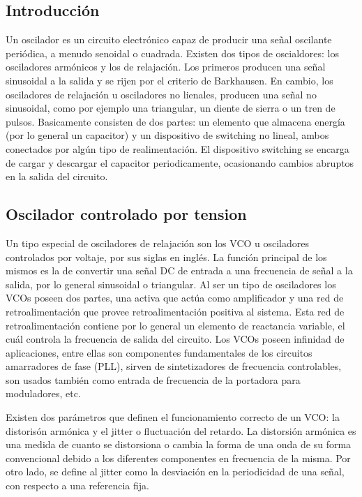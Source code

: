 \subsection{Introducción}

Un oscilador es un circuito electrónico capaz de producir una señal oscilante periódica, a menudo senoidal o cuadrada. Existen dos tipos de oscialdores: los osciladores armónicos y los de relajación. Los primeros producen una señal sinusoidal a la salida y se rijen por el criterio de Barkhausen. En cambio, los osciladores de relajación u osciladores no lienales, producen una señal no sinusoidal, como por ejemplo una triangular, un diente de sierra o un tren de pulsos. Basicamente consisten de dos partes: un elemento que almacena energía (por lo general un capacitor) y un dispositivo de switching no lineal, ambos conectados por algún tipo de realimentación. El dispositivo switching se encarga de cargar y descargar el capacitor periodicamente, ocasionando cambios abruptos en la salida del circuito. 


\subsection{Oscilador controlado por tension}

Un tipo especial de osciladores de relajación son los VCO u osciladores controlados por voltaje, por sus siglas en inglés. La función principal de los mismos es la de convertir una señal DC de entrada a una frecuencia de señal a la salida, por lo general sinusoidal o triangular. Al ser un tipo de osciladores los VCOs poseen dos partes, una activa que actúa como amplificador y una red de retroalimentación que provee retroalimentación positiva al sistema. Esta red de retroalimentación contiene por lo general un elemento de reactancia variable, el cuál controla la frecuencia de salida del circuito. 
Los VCOs poseen infinidad de aplicaciones, entre ellas son componentes fundamentales de los circuitos amarradores de fase (PLL), sirven de sintetizadores de frecuencia controlables, son usados también como entrada de frecuencia de la portadora para moduladores, etc.


Existen dos par\'ametros que definen el funcionamiento correcto de un VCO: la distoris\'on arm\'onica y el jitter o fluctuaci\'on del retardo. La distorsi\'on arm\'onica es una medida de cuanto se distorsiona o cambia la forma de una onda de su forma convencional debido a los diferentes componentes en frecuencia de la misma. Por otro lado, se define al jitter como la desviaci\'on en la periodicidad de una señal, con respecto a una referencia fija. 


